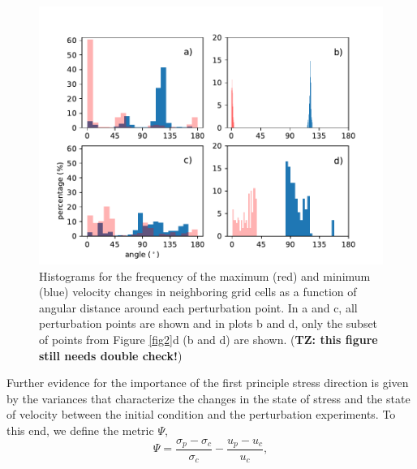 \documentclass[review,oneside]{igs}
\begin{document}
\begin{figure}
	\centering
    \includegraphics[width=1\linewidth]{figs/fig4.pdf}
    \caption{Histograms for the frequency of the maximum (red) and minimum (blue) velocity changes in neighboring grid cells as a function of angular distance around each perturbation point. In a and c, all perturbation points are shown and in plots b and d, only the subset of points from Figure \ref{fig2}d (b and d) are shown. ({\bf{TZ: this figure still needs double check!}})}
	\label{fig4}
	\label{fig4}
\end{figure}

Further evidence for the importance of the first principle stress direction is given by the variances that characterize the changes in the state of stress and the state of velocity between the initial condition and the perturbation experiments. To this end, we define the metric $\Psi$,  
\begin{equation}
\Psi = \frac{\sigma_{p}-\sigma_{c}}{\sigma_{c}} - \frac{u_{p}-u_{c}}{u_{c}},
\label{psi}
\end{equation}
\end{document}
